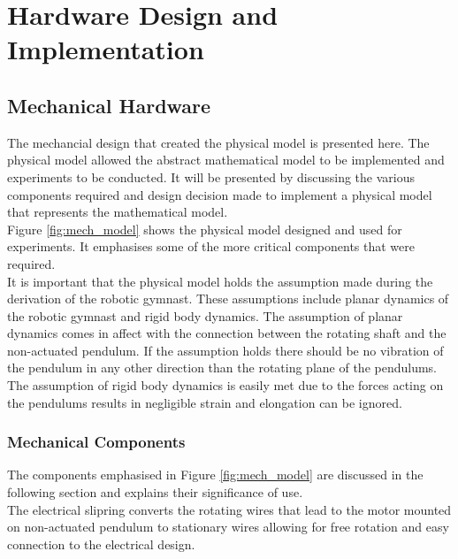 \chapter{Hardware Design and Implementation}


\section{Mechanical Hardware}
The mechancial design that created the physical model is presented here. The physical model allowed the abstract mathematical model to be implemented and experiments to be conducted. It will be presented by discussing the various components required and design decision made to implement a physical model that represents the mathematical model.\\

Figure \ref{fig:mech_model} shows the physical model designed and used for experiments. It emphasises some of the more critical components that were required.\\

It is important that the physical model holds the assumption made during the derivation of the robotic gymnast. These assumptions include planar dynamics of the robotic gymnast and rigid body dynamics. The assumption of planar dynamics comes in affect with the connection between the rotating shaft and the non-actuated pendulum. If the assumption holds there should be no vibration of the pendulum in any other direction than the rotating plane of the pendulums. \\

The assumption of rigid body dynamics is easily met due to the forces acting on the pendulums results in negligible strain and elongation can be ignored.

\subsection{Mechanical Components}
The components emphasised in Figure \ref{fig:mech_model} are discussed in the following section and explains their significance of use.\\

The electrical slipring converts the rotating wires that lead to the motor mounted on non-actuated pendulum to stationary wires allowing for free rotation and easy connection to the electrical design.\\

